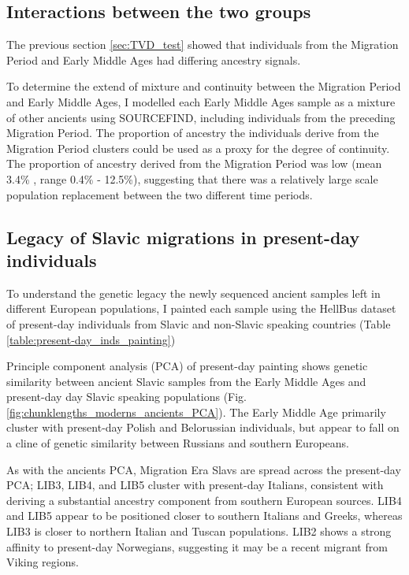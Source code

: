 \subsection{Interactions between the two groups}

The previous section \ref{sec:TVD_test} showed that individuals from the Migration Period and Early Middle Ages had differing ancestry signals. 

To determine the extend of mixture and continuity between the Migration Period and Early Middle Ages, I modelled each Early Middle Ages sample as a mixture of other ancients using SOURCEFIND, including individuals from the preceding Migration Period. The proportion of ancestry the individuals derive from the Migration Period clusters could be used as a proxy for the degree of continuity. The proportion of ancestry derived from the Migration Period was low (mean 3.4\% , range 0.4\% - 12.5\%), suggesting that there was a relatively large scale population replacement between the two different time periods. 

\subsection{Legacy of Slavic migrations in present-day individuals}

To understand the genetic legacy the newly sequenced ancient samples left in different European populations, I painted each sample using the HellBus dataset of present-day individuals from Slavic and non-Slavic speaking countries (Table \ref{table:present-day_inds_painting})

Principle component analysis (PCA) of present-day painting shows genetic similarity between ancient Slavic samples from the Early Middle Ages and present-day day Slavic speaking populations (Fig. \ref{fig:chunklengths_moderns_ancients_PCA}). The Early Middle Age primarily cluster with present-day Polish and Belorussian individuals, but appear to fall on a cline of genetic similarity between Russians and southern Europeans. 

As with the ancients PCA, Migration Era Slavs are spread across the present-day PCA; LIB3, LIB4, and LIB5 cluster with present-day Italians, consistent with deriving a substantial ancestry component from southern European sources. LIB4 and LIB5 appear to be positioned closer to southern Italians and Greeks, whereas LIB3 is closer to northern Italian and Tuscan populations. LIB2 shows a strong affinity to present-day Norwegians, suggesting it may be a recent migrant from Viking regions. 

